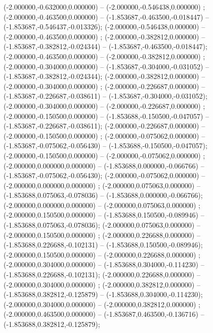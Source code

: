  (-2.000000,-0.632000,0.000000) -- (-2.000000,-0.546438,0.000000) ;
 (-2.000000,-0.463500,0.000000) -- (-1.853687,-0.463500,-0.018447) -- (-1.853687,-0.546437,-0.013326);
 (-2.000000,-0.546438,0.000000) -- (-2.000000,-0.463500,0.000000) ;
 (-2.000000,-0.382812,0.000000) -- (-1.853687,-0.382812,-0.024344) -- (-1.853687,-0.463500,-0.018447);
 (-2.000000,-0.463500,0.000000) -- (-2.000000,-0.382812,0.000000) ;
 (-2.000000,-0.304000,0.000000) -- (-1.853687,-0.304000,-0.031052) -- (-1.853687,-0.382812,-0.024344);
 (-2.000000,-0.382812,0.000000) -- (-2.000000,-0.304000,0.000000) ;
 (-2.000000,-0.226687,0.000000) -- (-1.853687,-0.226687,-0.038611) -- (-1.853687,-0.304000,-0.031052);
 (-2.000000,-0.304000,0.000000) -- (-2.000000,-0.226687,0.000000) ;
 (-2.000000,-0.150500,0.000000) -- (-1.853688,-0.150500,-0.047057) -- (-1.853687,-0.226687,-0.038611);
 (-2.000000,-0.226687,0.000000) -- (-2.000000,-0.150500,0.000000) ;
 (-2.000000,-0.075062,0.000000) -- (-1.853687,-0.075062,-0.056430) -- (-1.853688,-0.150500,-0.047057);
 (-2.000000,-0.150500,0.000000) -- (-2.000000,-0.075062,0.000000) ;
 (-2.000000,0.000000,0.000000) -- (-1.853688,0.000000,-0.066766) -- (-1.853687,-0.075062,-0.056430);
 (-2.000000,-0.075062,0.000000) -- (-2.000000,0.000000,0.000000) ;
 (-2.000000,0.075063,0.000000) -- (-1.853688,0.075063,-0.078036) -- (-1.853688,0.000000,-0.066766);
 (-2.000000,0.000000,0.000000) -- (-2.000000,0.075063,0.000000) ;
 (-2.000000,0.150500,0.000000) -- (-1.853688,0.150500,-0.089946) -- (-1.853688,0.075063,-0.078036);
 (-2.000000,0.075063,0.000000) -- (-2.000000,0.150500,0.000000) ;
 (-2.000000,0.226688,0.000000) -- (-1.853688,0.226688,-0.102131) -- (-1.853688,0.150500,-0.089946);
 (-2.000000,0.150500,0.000000) -- (-2.000000,0.226688,0.000000) ;
 (-2.000000,0.304000,0.000000) -- (-1.853688,0.304000,-0.114230) -- (-1.853688,0.226688,-0.102131);
 (-2.000000,0.226688,0.000000) -- (-2.000000,0.304000,0.000000) ;
 (-2.000000,0.382812,0.000000) -- (-1.853688,0.382812,-0.125879) -- (-1.853688,0.304000,-0.114230);
 (-2.000000,0.304000,0.000000) -- (-2.000000,0.382812,0.000000) ;
 (-2.000000,0.463500,0.000000) -- (-1.853687,0.463500,-0.136716) -- (-1.853688,0.382812,-0.125879);
